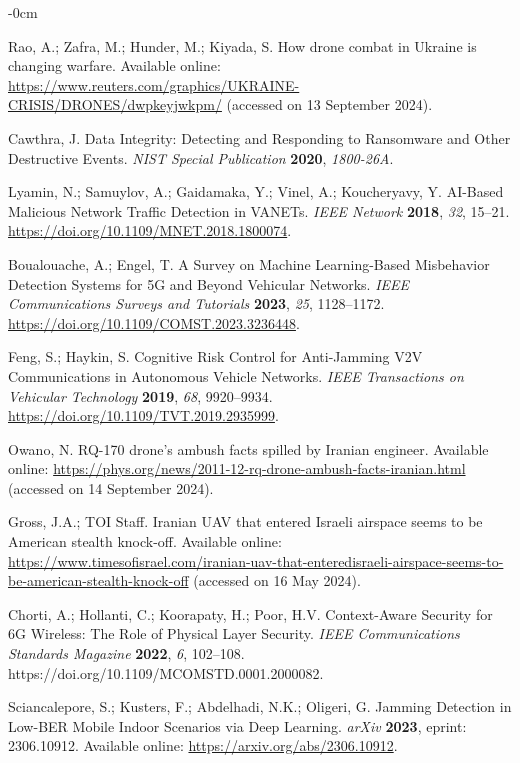 \documentclass[futureinternet,article,submit,pdftex,moreauthors]{Definitions/mdpi}
\begin{document}
\begin{adjustwidth}{-\extralength}{0cm}
\begin{thebibliography}{999}
Rao, A.; Zafra, M.; Hunder, M.; Kiyada, S. How drone combat in Ukraine is changing warfare. Available online: \url{https://www.reuters.com/graphics/UKRAINE-CRISIS/DRONES/dwpkeyjwkpm/} (accessed on 13 September 2024).

Cawthra, J. Data Integrity: Detecting and Responding to Ransomware and Other Destructive Events. {\em NIST Special Publication} {\bf 2020}, {\em 1800-26A}.

Lyamin, N.; Samuylov, A.; Gaidamaka, Y.; Vinel, A.; Koucheryavy, Y. AI-Based Malicious Network Traffic Detection in VANETs. {\em IEEE Network} {\bf 2018}, {\em 32}, 15--21. \url{https://doi.org/10.1109/MNET.2018.1800074}.

Boualouache, A.; Engel, T. A Survey on Machine Learning-Based Misbehavior Detection Systems for 5G and Beyond Vehicular Networks. {\em IEEE Communications Surveys and Tutorials} {\bf 2023}, {\em 25}, 1128--1172. \url{https://doi.org/10.1109/COMST.2023.3236448}.

Feng, S.; Haykin, S. Cognitive Risk Control for Anti-Jamming V2V Communications in Autonomous Vehicle Networks. {\em IEEE Transactions on Vehicular Technology} {\bf 2019}, {\em 68}, 9920--9934. \url{https://doi.org/10.1109/TVT.2019.2935999}.

Owano, N. RQ-170 drone's ambush facts spilled by Iranian engineer. Available online: \url{https://phys.org/news/2011-12-rq-drone-ambush-facts-iranian.html} (accessed on 14 September 2024).

Gross, J.A.; TOI Staff. Iranian UAV that entered Israeli airspace seems to be American stealth knock-off. Available online: \url{https://www.timesofisrael.com/iranian-uav-that-enteredisraeli-airspace-seems-to-be-american-stealth-knock-off} (accessed on 16 May 2024).

Chorti, A.; Hollanti, C.; Koorapaty, H.; Poor, H.V. Context-Aware Security for 6G Wireless: The Role of Physical Layer Security. {\em IEEE Communications Standards Magazine} {\bf 2022}, {\em 6}, 102--108. https://doi.org/10.1109/MCOMSTD.0001.2000082.

Sciancalepore, S.; Kusters, F.; Abdelhadi, N.K.; Oligeri, G. Jamming Detection in Low-BER Mobile Indoor Scenarios via Deep Learning. {\em arXiv} {\bf 2023}, eprint: 2306.10912. Available online: \url{https://arxiv.org/abs/2306.10912}.


\end{thebibliography}
\end{adjustwidth}
\end{document}
